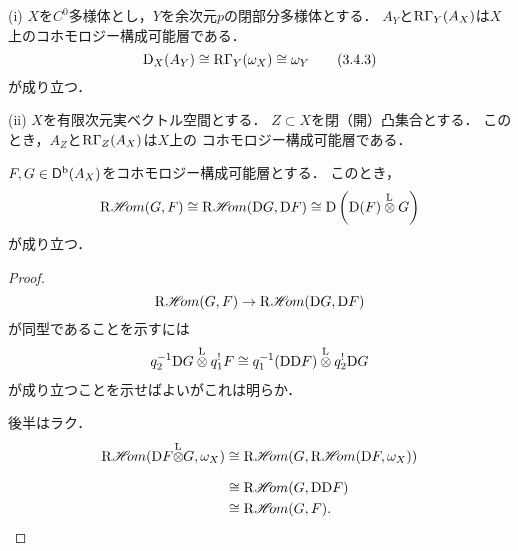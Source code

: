 \begin{EG}[{\cite[Example 3.4.5]{KS90}}]
    (i) 
    \(X\)を\(C^0\)多様体とし，\(Y\)を余次元\(p\)の閉部分多様体とする．
    \(A_Y\)と\(\mathop{\mathrm{R}\hspace{-0pt}\Gamma}\nolimits_Y(A_X)\)は\(X\)上のコホモロジー構成可能層である．
    \begin{equation}
        \mathrm{D}_X(A_Y)\cong \mathop{\mathrm{R}\hspace{-0pt}\Gamma}\nolimits_Y(\omega_X)\cong\omega_Y\tag{3.4.3}
    \end{equation}
    が成り立つ．

    (ii) 
    \(X\)を有限次元実ベクトル空間とする．
    \(Z\subset X\)を閉（開）凸集合とする．
    このとき，\(A_Z\)と\(\mathop{\mathrm{R}\hspace{-0pt}\Gamma}\nolimits_Z(A_X)\)は\(X\)上の
    コホモロジー構成可能層である．
\end{EG}

\begin{leftbar}
\begin{PRP}[{\cite[Proposition 3.4.6]{KS90}}]
    \(F, G\in \mathop{\mathsf{D}^\mathrm{b}}\nolimits(A_X)\)をコホモロジー構成可能層とする．
    このとき，
    \[
        \RHOM(G,F)\cong
        \RHOM(\rmD{G},\rmD{F})\cong
        \rmD\left(\rmD(F)\ltens G\right)
    \]
    が成り立つ．
\end{PRP}
\end{leftbar}

\begin{proof}
    \[
        \mathop{\mathrm{R}\hspace{-1.5pt}\mathop{\mathscr{H}\hspace{-2pt}om}\nolimits}\nolimits(G,F)\to
        \mathop{\mathrm{R}\hspace{-1.5pt}\mathop{\mathscr{H}\hspace{-2pt}om}\nolimits}\nolimits(\mathrm{D}{G},\mathrm{D}{F})
    \]
    が同型であることを示すには
    \[
        q_2^{-1}\rmD{G}\ltens q_1^{!}F    
        \cong
        q_1^{-1}(\rmD\rmD{F})\ltens q_2^{!}\rmD G
    \]
    が成り立つことを示せばよいがこれは明らか．

    後半はラク．
    \begin{align*}
        \RHOM(\rmD{F}\lltens G,\omega_X)
        &\cong
        \RHOM(G,\RHOM(\rmD{F},\omega_X))\\
        &\cong
        \RHOM(G,\rmD\rmD{F})\\
        &\cong
        \RHOM(G,F).
    \end{align*}
\end{proof}





















